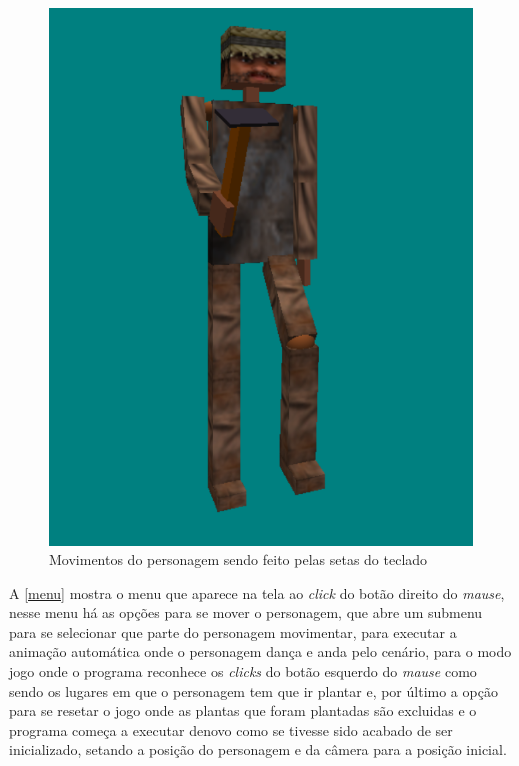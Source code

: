 \documentclass[
	12pt,				%
	openright,			%
	a4paper,			%
	english,			%
	french,				%
	spanish,			%
	brazil,				%
	]{abntex2}
\begin{document}
\begin{figure}[H]
\centering 
\caption{Movimentos do personagem sendo feito pelas setas do teclado} \label{movimentopersonagem}
\includegraphics[scale=0.6]{imagens/movimentopersonagem.png}
\end{figure}



	A \autoref{menu} mostra o menu que aparece na tela ao \emph{click} do botão direito do \emph{mause}, nesse menu há as opções para se mover o personagem, que abre um submenu para se selecionar que parte do personagem movimentar, para executar a animação automática onde o personagem dança e anda pelo cenário, para o modo jogo onde o programa reconhece os \emph{clicks} do botão esquerdo do \emph{mause} como sendo os lugares em que o personagem tem  que ir plantar e, por último a opção para se resetar o jogo onde as plantas que foram plantadas são excluidas e o programa começa a executar denovo como se tivesse sido acabado de ser inicializado, setando a posição do personagem e da câmera  para a posição inicial.  
\end{document}
